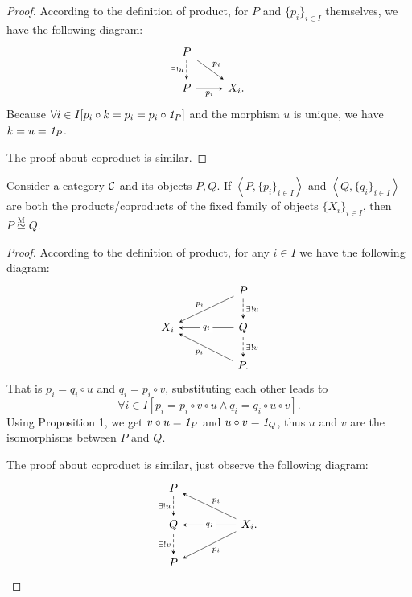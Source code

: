 \documentclass{article}
\begin{document}
\begin{proof}
	 According to the definition of product, for $P$ and $\{p_i\}_{i\in I}$ themselves, we have the following diagram:
	\[\begin{tikzcd}
		P \arrow[->,>=stealth, rd, "p_i"] \arrow[->,>=stealth, d, "\exists!u"', dashed] & \\
		P \arrow[->,>=stealth, r, "p_i"'] & X_i.
		\end{tikzcd}\]
	Because $\forall i\in I[p_i\circ k=p_i=p_i\circ\mathit{1}_P]$ and the morphism $u$ is unique, we have $k=u=\mathit{1}_P$.
	
	The proof about coproduct is similar.
\end{proof}


\begin{thm}
	Consider a category $\mathcal{C}$ and its objects $P,Q$. If $\left<P,\{p_i\}_{i\in I}\right>$ and $\left<Q,\{q_i\}_{i\in I}\right>$ are both the products/coproducts of the fixed family of objects $\{X_i\}_{i\in I}$, then $P\mathop{\simeq}\limits^\mathrm{M}Q$.
\end{thm}

\begin{proof}
	According to the definition of product, for any $i\in I$ we have the following diagram:		\[\begin{tikzcd}
		& & P \arrow[->,>=stealth, d, "\exists!u", dashed] \arrow[->,>=stealth, lld, "p_i"']\\
		X_i & & Q \arrow[->,>=stealth, d, "\exists!v", dashed] \arrow[->,>=stealth, ll, "q_i" description]\\
		& & P. \arrow[->,>=stealth, llu, "p_i"]
	\end{tikzcd}\]
	That is $p_i=q_i\circ u$ and $q_i=p_i\circ v$, substituting each other leads to
			$$\forall i\in I[p_i=p_i\circ v\circ u\wedge q_i=q_i\circ u\circ v].$$
	Using Proposition 1, we get $v\circ u=\mathit{1}_P$ and $u\circ v=\mathit{1}_Q$, thus $u$ and $v$ are the isomorphisms between $P$ and $Q$.
	
	The proof about coproduct is similar, just observe the following diagram:
	\[\begin{tikzcd}
		P \arrow[->,>=stealth, d, "\exists!u"', dashed] & & \\		
		Q \arrow[->,>=stealth, d, "\exists!v"', dashed] & &
		X_i. \arrow[->,>=stealth, llu, "p_i"'] \arrow[->,>=stealth, ll, "q_i" description] \arrow[->,>=stealth, lld, "p_i"] \\ P & &
	\end{tikzcd}\]
\end{proof}
\end{document}
